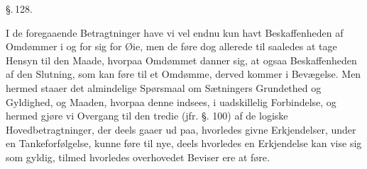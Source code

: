 \documentclass[12pt]{book}
\def\textit#1{#1}%
\newcommand{\parag}[1]{%
  \par\vspace{0.9\baselineskip}%
  {\centering\textit{\S.\,#1.}\par}%
  \vspace{0.35\baselineskip}%
  \noindent\hspace{\parindent}\ignorespaces
}
\newcommand{\opage}[1]{\marginnote{\footnotesize\textit{[#1]}}}
\begin{document}
\opage{311} \parag{128}

I de foregaaende Betragtninger have vi vel endnu kun havt Beskaffenheden af
Omdømmer i og for sig for Øie, men de føre dog allerede til saaledes at tage
Hensyn til den Maade, hvorpaa Omdømmet danner sig, at ogsaa Beskaffenheden af
den Slutning, som kan føre til et Omdømme, derved kommer i Bevægelse. Men
hermed staaer det almindelige Spørsmaal om Sætningers Grundethed og Gyldighed,
og Maaden, hvorpaa denne indsees, i uadskillelig Forbindelse, og hermed gjøre vi
Overgang til den tredie (jfr. §. 100) af de logiske Hovedbetragtninger, der
deels gaaer ud paa, hvorledes givne Erkjendelser, under en Tankeforfølgelse,
kunne føre til nye, deels hvorledes en Erkjendelse kan vise sig som gyldig,
tilmed hvorledes overhovedet Beviser ere at føre.
\end{document}

